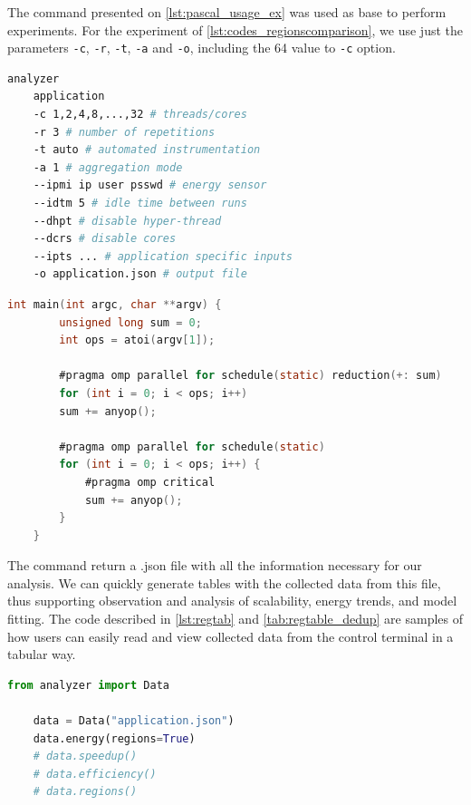 The command presented on \cref{lst:pascal_usage_ex} was used as base to perform experiments. For the experiment of \cref{lst:codes_regionscomparison}, we use just the parameters {\tt -c}, {\tt -r}, {\tt -t}, {\tt -a} and {\tt -o}, including the 64 value to {\tt -c} option.

\lstset{style=ccodestyle, frame=tb}
\begin{lstlisting}[label={lst:pascal_usage_ex}, language=bash, caption={Command line showing how experiments were run through a terminal.}]
	analyzer 
	application
	-c 1,2,4,8,...,32 # threads/cores
	-r 3 # number of repetitions
	-t auto # automated instrumentation
	-a 1 # aggregation mode
	--ipmi ip user psswd # energy sensor
	--idtm 5 # idle time between runs
	--dhpt # disable hyper-thread
	--dcrs # disable cores
	--ipts ... # application specific inputs
	-o application.json # output file
\end{lstlisting}

\lstset{style=ccodestyle, frame=tb}
\begin{lstlisting}[label={lst:codes_regionscomparison}, language=C, caption={Sample code used to visualize the impact of regions on program scalability.}]
	int main(int argc, char **argv) {
		unsigned long sum = 0;
		int ops = atoi(argv[1]);
		
		#pragma omp parallel for schedule(static) reduction(+: sum)
		for (int i = 0; i < ops; i++)
		sum += anyop();
		
		#pragma omp parallel for schedule(static)
		for (int i = 0; i < ops; i++) {
			#pragma omp critical
			sum += anyop();
		}
	}
\end{lstlisting}

The command return a .json file with all the information necessary for our analysis. We can quickly generate tables with the collected data from this file, thus supporting observation and analysis of scalability, energy trends, and model fitting. The code described in \cref{lst:regtab} and \cref{tab:regtable_dedup} are samples of how users can easily read and view collected data from the control terminal in a tabular way.

\lstset{style=pythonStyle, frame=tb}
\begin{lstlisting}[label={lst:regtab}, language=python, captionpos=b, caption={Example of using the Python API to load analyzer files.}]
	from analyzer import Data
	
	data = Data("application.json")
	data.energy(regions=True)
	# data.speedup()
	# data.efficiency()
	# data.regions()
\end{lstlisting}

